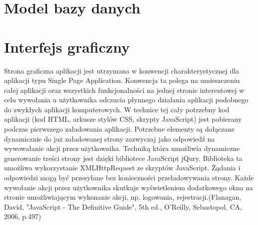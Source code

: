\section{Model bazy danych}
\label{sec;modelBazyDanych}
\noindent
\begin{minipage}{\linewidth}
\end{minipage}

\section{Interfejs graficzny}
\label{sec:interfejsGraficzny}
Strona graficzna aplikacji jest utrzymana w konwencji charakterystycznej dla aplikacji typu Single Page Application. Konwencja ta polega na umieszczeniu całej aplikacji oraz wszystkich funkcjonalności na jednej stronie interentowej w celu wywołania u użytkownika odczucia płynnego działania aplikacji podobnego do zwykłych aplikacji komputerowych. W technice tej cały potrzebny kod aplikacji (kod HTML, arkusze stylów CSS, skrypty JavaScript) jest pobierany podczas pierwszego załadowania aplikacji. Potrzebne elementy są dołączane dynamicznie do już załadowanej strony zazwyczaj jako odpowiedź na wywowałanie akcji przez użytkownika. Techniką która umożliwia dynamiczne generowanie treści strony jest dzięki bibliotece JavaScript jQury. Biblioteka ta umożliwa wykorzystanie XMLHttpRequest ze skryptów JavaScript. Żądania i odpowiedzi mogą być przesyłane bez konieczności przeładowywania strony. Każde wywołanie akcji przez użytkownika skutkuje wyświetleniem dodatkowego okna na stronie umożliwiającym wykonanie akcji, np. logowania, rejestracji.(Flanagan, David, "JavaScript - The Definitive Guide", 5th ed., O'Reilly, Sebastopol, CA, 2006, p.497)


